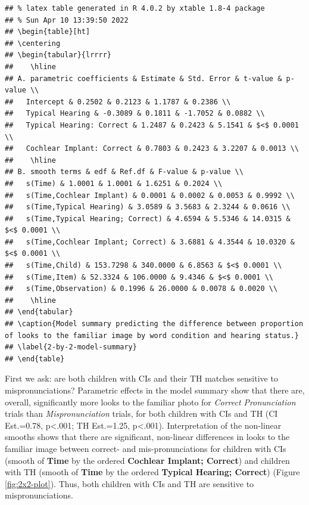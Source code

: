 \documentclass[
]{article}
\begin{document}
\begin{verbatim}
## % latex table generated in R 4.0.2 by xtable 1.8-4 package
## % Sun Apr 10 13:39:50 2022
## \begin{table}[ht]
## \centering
## \begin{tabular}{lrrrr}
##    \hline
## A. parametric coefficients & Estimate & Std. Error & t-value & p-value \\ 
##   Intercept & 0.2502 & 0.2123 & 1.1787 & 0.2386 \\ 
##   Typical Hearing & -0.3089 & 0.1811 & -1.7052 & 0.0882 \\ 
##   Typical Hearing: Correct & 1.2487 & 0.2423 & 5.1541 & $<$ 0.0001 \\ 
##   Cochlear Implant: Correct & 0.7803 & 0.2423 & 3.2207 & 0.0013 \\ 
##    \hline
## B. smooth terms & edf & Ref.df & F-value & p-value \\ 
##   s(Time) & 1.0001 & 1.0001 & 1.6251 & 0.2024 \\ 
##   s(Time,Cochlear Implant) & 0.0001 & 0.0002 & 0.0053 & 0.9992 \\ 
##   s(Time,Typical Hearing) & 3.0589 & 3.5683 & 2.3244 & 0.0616 \\ 
##   s(Time,Typical Hearing; Correct) & 4.6594 & 5.5346 & 14.0315 & $<$ 0.0001 \\ 
##   s(Time,Cochlear Implant; Correct) & 3.6881 & 4.3544 & 10.0320 & $<$ 0.0001 \\ 
##   s(Time,Child) & 153.7298 & 340.0000 & 6.8563 & $<$ 0.0001 \\ 
##   s(Time,Item) & 52.3324 & 106.0000 & 9.4346 & $<$ 0.0001 \\ 
##   s(Time,Observation) & 0.1996 & 26.0000 & 0.0078 & 0.0020 \\ 
##    \hline
## \end{tabular}
## \caption{Model summary predicting the difference between proportion of looks to the familiar image by word condition and hearing status.} 
## \label{2-by-2-model-summary}
## \end{table}
\end{verbatim}

First we ask: are both children with CIs and their TH matches sensitive to mispronunciations? Parametric effects in the model summary show that there are, overall, significantly more looks to the familiar photo for \emph{Correct Pronunciation} trials than \emph{Mispronunciation} trials, for both children with CIs and TH (CI Est.=0.78, p\textless.001; TH Est.=1.25, p\textless.001). Interpretation of the non-linear smooths shows that there are significant, non-linear differences in looks to the familiar image between correct- and mis-pronunciations for children with CIs (smooth of \textbf{Time} by the ordered \textbf{Cochlear Implant; Correct}) and children with TH (smooth of \textbf{Time} by the ordered \textbf{Typical Hearing; Correct}) (Figure \ref{fig:2x2-plot}). Thus, both children with CIs and TH are sensitive to mispronunciations.
\end{document}
